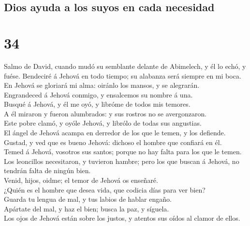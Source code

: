 \hypertarget{dios-ayuda-a-los-suyos-en-cada-necesidad}{%
\subsection{Dios ayuda a los suyos en cada
necesidad}\label{dios-ayuda-a-los-suyos-en-cada-necesidad}}

\hypertarget{section-33}{%
\section{34}\label{section-33}}

 Salmo de David, cuando mudó su semblante delante de
Abimelech, y él lo echó, y fuése. Bendeciré á Jehová en todo tiempo; su
alabanza será siempre en mi boca.\\
 En Jehová se gloriará mi alma: oiránlo los mansos, y se
alegrarán.\\
 Engrandeced á Jehová conmigo, y ensalcemos su nombre á
una.\\
 Busqué á Jehová, y él me oyó, y libróme de todos mis
temores.\\
 A él miraron y fueron alumbrados: y sus rostros no se
avergonzaron.\\
 Este pobre clamó, y oyóle Jehová, y librólo de todas sus
angustias.\\
 El ángel de Jehová acampa en derredor de los que le
temen, y los defiende.\\
 Gustad, y ved que es bueno Jehová: dichoso el hombre que
confiará en él.\\
 Temed á Jehová, vosotros sus santos; porque no hay falta
para los que le temen.\\
 Los leoncillos necesitaron, y tuvieron hambre; pero los
que buscan á Jehová, no tendrán falta de ningún bien.\\
 Venid, hijos, oidme; el temor de Jehová os enseñaré.\\
 ¿Quién es el hombre que desea vida, que codicia días
para ver bien?\\
 Guarda tu lengua de mal, y tus labios de hablar
engaño.\\
 Apártate del mal, y haz el bien; busca la paz, y
síguela.\\
 Los ojos de Jehová están sobre los justos, y atentos sus
oídos al clamor de ellos.\\
